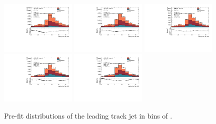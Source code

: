 \begin{figure}[htbp]
  \centering
 \includegraphics[width=0.32\textwidth]{figures/gbb/Sub_Sd0_Fits/Canv_PreFit_0-Zp_T-01_LpT_INF_SpT_INF_coarse_x.pdf}
 \includegraphics[width=0.32\textwidth]{figures/gbb/Sub_Sd0_Fits/Canv_PreFit_01-Zp_T-02_LpT_INF_SpT_INF_coarse_x.pdf}
 \includegraphics[width=0.32\textwidth]{figures/gbb/Sub_Sd0_Fits/Canv_PreFit_02-Zp_T-03_LpT_INF_SpT_INF_coarse_x.pdf}\\
 \includegraphics[width=0.32\textwidth]{figures/gbb/Sub_Sd0_Fits/Canv_PreFit_03-Zp_T-04_LpT_INF_SpT_INF_coarse_x.pdf}
 \includegraphics[width=0.32\textwidth]{figures/gbb/Sub_Sd0_Fits/Canv_PreFit_04-Zp_T-05_LpT_INF_SpT_INF_coarse_x.pdf}

\caption{Pre-fit \subsdzero distributions of the leading track jet in bins of \zpt. }
  \label{fig:ZpT-prefits-leading}
\end{figure}


